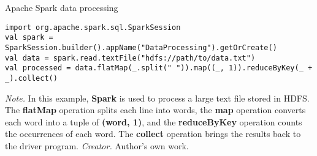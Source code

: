 \begin{table}[h!]
\caption{Apache Spark data processing}
\begin{lstlisting}
import org.apache.spark.sql.SparkSession
val spark = SparkSession.builder().appName("DataProcessing").getOrCreate()
val data = spark.read.textFile("hdfs://path/to/data.txt")
val processed = data.flatMap(_.split(" ")).map((_, 1)).reduceByKey(_ + _).collect()
\end{lstlisting}
\small
\textit{Note.} In this example, \textbf{Spark} is used to process a large text file stored in HDFS. The \textbf{flatMap} operation splits each line into words, the \textbf{map} operation converts each word into a tuple of \textbf{(word, 1)}, and the \textbf{reduceByKey} operation counts the occurrences of each word. The \textbf{collect} operation brings the results back to the driver program.
\textit{Creator.} Author's own work.
\end{table}